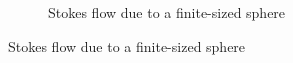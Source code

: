\begin{figure}
\begin{subfigure}[t]{0.45\linewidth}
        \caption{Stokes flow due to a finite-sized sphere}%
        \label{fig:flow_sphere_rp}%
    \end{subfigure}
    

\end{figure}
